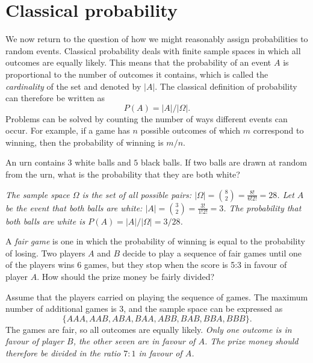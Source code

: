
\section{Classical probability}\label{sec:classical}

We now return to the question of how we might reasonably assign probabilities to random events. Classical probability deals with finite sample spaces in which all outcomes are equally likely. This means that the probability of an event $A$ is proportional to the number of outcomes it contains, which is called the \emph{cardinality} of the set and denoted by $|A|$. The classical definition of probability can therefore be written as
\[
P(A) = |A|/|\Omega|.
\]
Problems can be solved by counting the number of ways different events can occur. For example, if a game has $n$ possible outcomes of which $m$ correspond to winning, then the probability of winning is $m/n$.

\begin{example}
An urn contains $3$ white balls and $5$ black balls. If two balls are drawn at random from the urn, what is the probability that they are both white?
\begin{solution}
\bit
\it The sample space $\Omega$ is the set of all possible pairs:
$|\Omega|	= \binom{8}{2} = \frac{8!}{6!2!} = 28$. 
\it Let $A$ be the event that both balls are white: 
$|A|  = \binom{3}{2} = \frac{3!}{1!2!} = 3$.
\eit
The probability that both balls are white is $P(A) = |A|/|\Omega| = 3/28$.
\end{solution}
\end{example}

\begin{exercise}
A \emph{fair game} is one in which the probability of winning is equal to the probability of losing. Two players $A$ and $B$ decide to play a sequence of fair games until one of the players wins 6 games, but they stop when the score is 5:3 in favour of player $A$. How should the prize money be fairly divided?
\begin{answer}
Assume that the players carried on playing the sequence of games. The maximum number of additional games is 3, and the sample space can be expressed as
\[
\{AAA,AAB,ABA,BAA,ABB,BAB,BBA,BBB\}.
\]
The games are fair, so all outcomes are equally likely.
\bit
\it Only one outcome is in favour of player $B$, the other seven are in favour of $A$.
\it The prize money should therefore be divided in the ratio $7:1$ in favour of $A$.
\eit
\end{answer}
\end{exercise}

